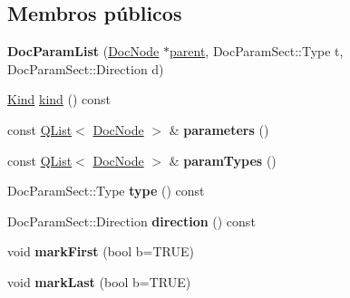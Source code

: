 \subsection*{Membros públicos}
\begin{DoxyCompactItemize}
\item 
\hypertarget{class_doc_param_list_ab5b8ec9b5c4fb3999ba0e73dc8e6bab6}{{\bfseries Doc\-Param\-List} (\hyperlink{class_doc_node}{Doc\-Node} $\ast$\hyperlink{class_doc_node_abd7f070d6b0a38b4da71c2806578d19d}{parent}, Doc\-Param\-Sect\-::\-Type t, Doc\-Param\-Sect\-::\-Direction d)}\label{class_doc_param_list_ab5b8ec9b5c4fb3999ba0e73dc8e6bab6}

\item 
\hyperlink{class_doc_node_aa10c9e8951b8ccf714a59ec321bdac5b}{Kind} \hyperlink{class_doc_param_list_aa9d037bed9f9a083d0cd01485637d843}{kind} () const 
\item 
\hypertarget{class_doc_param_list_a60337157a73e42f1a2f9d3be59273cac}{const \hyperlink{class_q_list}{Q\-List}$<$ \hyperlink{class_doc_node}{Doc\-Node} $>$ \& {\bfseries parameters} ()}\label{class_doc_param_list_a60337157a73e42f1a2f9d3be59273cac}

\item 
\hypertarget{class_doc_param_list_a776cb80ed2834017999952345117137f}{const \hyperlink{class_q_list}{Q\-List}$<$ \hyperlink{class_doc_node}{Doc\-Node} $>$ \& {\bfseries param\-Types} ()}\label{class_doc_param_list_a776cb80ed2834017999952345117137f}

\item 
\hypertarget{class_doc_param_list_aca8cacee236486cfcd39aa8709b984ec}{Doc\-Param\-Sect\-::\-Type {\bfseries type} () const }\label{class_doc_param_list_aca8cacee236486cfcd39aa8709b984ec}

\item 
\hypertarget{class_doc_param_list_ad2ddb3f2bc142b21085ff1a6ca8eec42}{Doc\-Param\-Sect\-::\-Direction {\bfseries direction} () const }\label{class_doc_param_list_ad2ddb3f2bc142b21085ff1a6ca8eec42}

\item 
\hypertarget{class_doc_param_list_a74f775b4b45a5f17bcf8372d1eeba3a7}{void {\bfseries mark\-First} (bool b=T\-R\-U\-E)}\label{class_doc_param_list_a74f775b4b45a5f17bcf8372d1eeba3a7}

\item 
\hypertarget{class_doc_param_list_a9f8e3e33b1f62d2e178e0009218fb2f3}{void {\bfseries mark\-Last} (bool b=T\-R\-U\-E)}\label{class_doc_param_list_a9f8e3e33b1f62d2e178e0009218fb2f3}


\end{DoxyCompactItemize}
